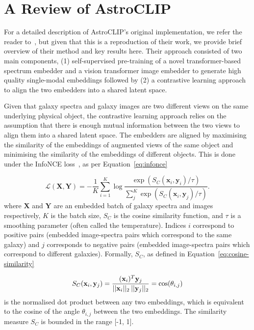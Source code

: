 
\section{A Review of AstroCLIP}\label{sec:original-paper}
For a detailed description of AstroCLIP's original implementation, we refer the reader to~\cite{astroclip}, but given that
this is a reproduction of their work, we provide brief overview of their method and key results here.
Their approach consisted of two main components, (1) self-supervised pre-training of a novel transformer-based spectrum
embedder and a vision transformer image embedder to generate high quality single-modal embeddings followed by (2) a
contrastive learning approach to align the two embedders into a shared latent space.

Given that galaxy spectra and galaxy images are two different views on the same underlying physical object, the
contrastive learning approach relies on the assumption that there is enough mutual information between the two views
to align them into a shared latent space.
The embedders are aligned by maximising the similarity of the embeddings of augmented views of the same object and
minimising the similarity of the embeddings of different objects.
This is done under the InfoNCE loss~\citep{oord2019}, as per Equation~\eqref{eq:infonce}

\begin{equation}
\label{eq:infonce}
    \mathcal{L}(\mathbf{X}, \mathbf{Y}) = - \frac{1}{K} \sum_{i=1}^K \log \frac{\exp(S_C(\mathbf{x}_i, \mathbf{y}_i) / \tau)}{\sum_{j}^K \exp(S_C(\mathbf{x}_i, \mathbf{y}_j) / \tau)}.
\end{equation}
where $\mathbf{X}$ and $\mathbf{Y}$ are an embedded batch of galaxy spectra and images respectively, $K$ is the batch size,
$S_C$ is the cosine similarity function, and $\tau$ is a smoothing parameter (often called the temperature).
Indices $i$ correspond to positive pairs (embedded image-spectra pairs which correspond to the same galaxy) and $j$ corresponds
to negative pairs (embedded image-spectra pairs which correspond to different galaxies).
Formally, $S_C$, as defined in Equation~\eqref{eq:cosine-similarity}

\begin{equation}
\label{eq:cosine-similarity}
    S_C(\mathbf{x}_i, \mathbf{y}_j) = \frac{(\mathbf{x}_i)^{T} \mathbf{y}_j}{ ||\mathbf{x}_i||_{2} \hspace{0.2em} ||\mathbf{y}_j||_{2}}
    = \cos(\theta_{i,j})
\end{equation}
is the normalised dot product between any two embeddings, which is equivalent to the cosine of the angle $\theta_{i,j}$ between the
two embeddings.
The similarity measure $S_C$ is bounded in the range [-1, 1].

